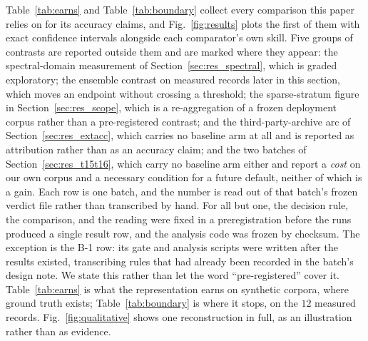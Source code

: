 \documentclass[review]{elsarticle}
\begin{document}
Table~\ref{tab:earns} and Table~\ref{tab:boundary} collect every comparison this
paper relies on for its accuracy claims, and Fig.~\ref{fig:results} plots the first
of them with exact confidence intervals alongside each comparator's own skill. Five
groups of contrasts are reported outside them and are marked where they appear: the
spectral-domain measurement of Section~\ref{sec:res_spectral}, which is graded
exploratory; the ensemble contrast on measured records later in this section, which
moves an endpoint without crossing a threshold; the sparse-stratum figure in
Section~\ref{sec:res_scope}, which is a re-aggregation of a frozen deployment
corpus rather than a pre-registered contrast; and the third-party-archive arc of
Section~\ref{sec:res_extacc}, which carries no baseline arm at all and is reported as
attribution rather than as an accuracy claim; and the two batches of
Section~\ref{sec:res_t15t16}, which carry no baseline arm either and report a
\emph{cost} on our own corpus and a necessary condition for a future default, neither
of which is a gain.
 Each row is one batch, and the number is read out of that batch's
frozen verdict file rather than transcribed by hand.
For all but one, the decision rule, the comparison, and the reading were fixed in a
preregistration before the runs produced a single result row, and the analysis code
was frozen by checksum. The exception is the B-1 row: its gate and analysis scripts
were written after the results existed, transcribing rules that had already been
recorded in the batch's design note. We state this rather than let the word
``pre-registered'' cover it.
Table~\ref{tab:earns} is what the representation earns on synthetic corpora,
where ground truth exists; Table~\ref{tab:boundary} is where it stops, on the
$12$ measured records. Fig.~\ref{fig:qualitative} shows one reconstruction in full, as an
illustration rather than as evidence.
\end{document}
